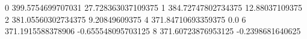 0 399.5754699707031 27.728363037109375
1 384.72747802734375 12.88037109375
2 381.05560302734375 9.20849609375
4 371.84710693359375 0.0
6 371.1915588378906 -0.655548095703125
8 371.60723876953125 -0.2398681640625
